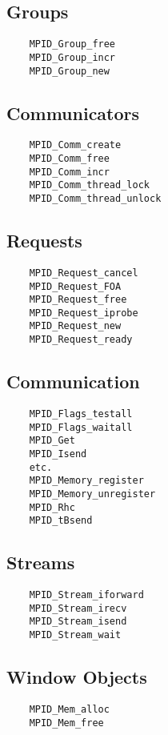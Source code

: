 \documentclass{article}
\begin{document}
\subsection{Groups}
\begin{verbatim}
    MPID_Group_free
    MPID_Group_incr
    MPID_Group_new
\end{verbatim}

\subsection{Communicators}
\begin{verbatim}
    MPID_Comm_create
    MPID_Comm_free
    MPID_Comm_incr
    MPID_Comm_thread_lock
    MPID_Comm_thread_unlock
\end{verbatim}

\subsection{Requests}
\begin{verbatim}
    MPID_Request_cancel
    MPID_Request_FOA
    MPID_Request_free
    MPID_Request_iprobe
    MPID_Request_new
    MPID_Request_ready
\end{verbatim}

\subsection{Communication}
\begin{verbatim}
    MPID_Flags_testall
    MPID_Flags_waitall
    MPID_Get
    MPID_Isend
    etc.
    MPID_Memory_register
    MPID_Memory_unregister
    MPID_Rhc
    MPID_tBsend
\end{verbatim}

\subsection{Streams}
\begin{verbatim}
    MPID_Stream_iforward
    MPID_Stream_irecv
    MPID_Stream_isend
    MPID_Stream_wait
\end{verbatim}

\subsection{Window Objects}
\begin{verbatim}
    MPID_Mem_alloc
    MPID_Mem_free
\end{verbatim}
\end{document}
